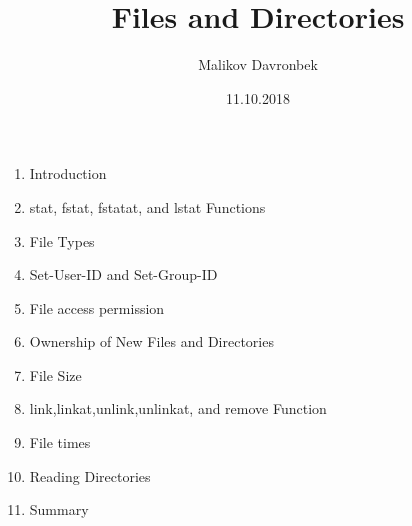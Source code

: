 \documentclass{beamer}
\title{Files and Directories}
\author{Malikov Davronbek}
\institute{Distributed Systems Lab.Gyeongsang National University}
\date{11.10.2018}
\begin{document}
\begin{frame}

\titlepage 
\end{frame}	
	
	
	
	
	
	
	
  	
\begin{frame}[t]\vspace*{10pt}
\begin{enumerate}
	\item Introduction
	\item stat, fstat, fstatat, and lstat Functions
	\item File Types
	\item Set-User-ID and Set-Group-ID
	\item File access permission
	\item Ownership of New Files and Directories
	\item File Size
	\item link,linkat,unlink,unlinkat, and remove Function
	\item File times
	\item Reading Directories
	\item Summary 

\end{enumerate}
\end{frame}
\end{document}
